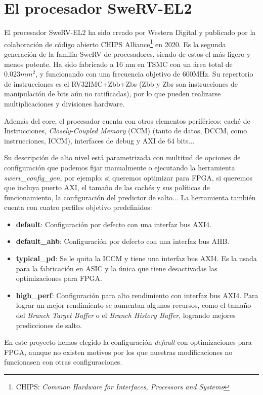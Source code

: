 \section{El procesador SweRV-EL2}

El procesador SweRV-EL2 ha sido creado por Western Digital y publicado por la colaboración de código abierto CHIPS Alliance\footnote{CHIPS: \textit{Common Hardware for Interfaces, Processors and Systems}} en 2020. Es la segunda generación de la familia SweRV de procesadores, siendo de estos el más ligero y menos potente. Ha sido fabricado a 16 nm en TSMC con un área total de $0.023mm^2$, y funcionando con una frecuencia objetivo de 600MHz. Su repertorio de instrucciones es el RV32IMC+Zbb+Zbs (Zbb y Zbs son instrucciones de manipulación de bits aún no ratificadas), por lo que pueden realizarse multiplicaciones y divisiones hardware.

Además del core, el procesador cuenta con otros elementos periféricos: caché de Instrucciones, \textit{Closely-Coupled Memory} (CCM) (tanto de datos, DCCM, como instrucciones, ICCM), interfaces de debug y AXI de 64 bits...

Su descripción de alto nivel está parametrizada con multitud de opciones de configuración que podemos fijar manualmente o ejecutando la herramienta \textit{swerv\_config\_gen}, por ejemplo: si queremos optimizar para FPGA, si queremos que incluya puerto AXI, el tamaño de las cachés y sus políticas de funcionamiento, la configuración del predictor de salto... La herramienta también cuenta con cuatro perfiles objetivo predefinidos:
\begin{itemize}[noitemsep]
    \item \textbf{default}: Configuración por defecto con una interfaz bus AXI4.
    \item \textbf{default\_ahb}: Configuración por defecto con una interfaz bus AHB.
    \item \textbf{typical\_pd}: Se le quita la ICCM y tiene una interfaz bus AXI4. Es la usada para la fabricación en ASIC y la única que tiene desactivadas las optimizaciones para FPGA.
    \item \textbf{high\_perf}: Configuración para alto rendimiento con interfaz bus AXI4. Para lograr un mejor rendimiento se aumentan algunos recursos, como el tamaño del \textit{Branch Target Buffer} o el \textit{Branch History Buffer}, logrando mejores predicciones de salto.
\end{itemize}

En este proyecto hemos elegido la configuración \textit{default} con optimizaciones para \mbox{FPGA}, aunque no existen motivos por los que nuestras modificaciones no funcionasen con otras configuraciones.

